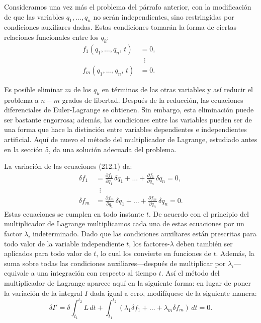 \documentclass[12pt,a4paper]{book}
\begin{document}
Consideramos una vez más el problema del párrafo anterior, con la modificación de que las variables $q_1, \ldots, q_n$ no serán independientes, sino restringidas por condiciones auxiliares dadas. Estas condiciones tomarán la forma de ciertas relaciones funcionales entre los $q_k$:
\begin{equation}
\begin{aligned}
f_1(q_1, \ldots, q_n, \, t) &= 0, \\
&\;\;\vdots \hspace{2cm} \tag{212.1} \\
f_m(q_1, \ldots, q_n, \, t) &= 0.
\end{aligned}
\end{equation}

Es posible eliminar $m$ de los $q_k$ en términos de las otras variables y así reducir el problema a $n - m$ grados de libertad. Después de la reducción, las ecuaciones diferenciales de Euler-Lagrange se obtienen. Sin embargo, esta eliminación puede ser bastante engorrosa; además, las condiciones entre las variables pueden ser de una forma que hace la distinción entre variables dependientes e independientes artificial. Aquí de nuevo el método del multiplicador de Lagrange, estudiado antes en la sección 5, da una solución adecuada del problema.

La variación de las ecuaciones (212.1) da:
\begin{equation}
\begin{aligned}
\delta f_1 &= \frac{\partial f_1}{\partial q_1} \, \delta q_1 + \ldots + \frac{\partial f_1}{\partial q_n} \, \delta q_n = 0, \\
&\;\;\vdots \hspace{4cm} \tag{212.2} \\
\delta f_m &= \frac{\partial f_m}{\partial q_1} \, \delta q_1 + \ldots + \frac{\partial f_m}{\partial q_n} \, \delta q_n = 0.
\end{aligned}
\end{equation}
Estas ecuaciones se cumplen en todo instante $t$. De acuerdo con el principio del multiplicador de Lagrange multiplicamos cada una de estas ecuaciones por un factor $\lambda_i$ indeterminado. Dado que las condiciones auxiliares están prescritas para todo valor de la variable independiente $t$, los factores-$\lambda$ deben también ser aplicados para todo valor de $t$, lo cual los convierte en funciones de $t$. Además, la suma sobre todas las condiciones auxiliares---después de multiplicar por $\lambda_i$---equivale a una integración con respecto al tiempo $t$. Así el método del multiplicador de Lagrange aparece aquí en la siguiente forma: en lugar de poner la variación de la integral $I$ dada igual a cero, modifíquese de la siguiente manera:
\begin{equation}
\delta I' = \delta \int_{t_1}^{t_2} L \, dt + \int_{t_1}^{t_2} (\lambda_1 \delta f_1 + \ldots + \lambda_m \delta f_m) \, dt = 0. \tag{212.3}
\end{equation}
\end{document}
